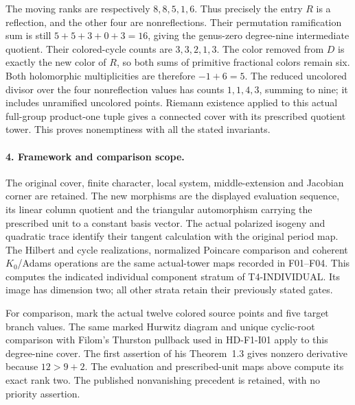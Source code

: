 The moving ranks are respectively $8,8,5,1,6$.
Thus precisely the entry $R$ is a reflection, and the
other four are nonreflections. Their permutation
ramification sum is still $5+5+3+0+3=16$, giving the
genus-zero degree-nine intermediate quotient.
Their colored-cycle counts are $3,3,2,1,3$.
The color removed from $D$ is exactly the new color of
$R$, so both sums of primitive fractional colors remain
six. Both holomorphic multiplicities are therefore
$-1+6=5$.
The reduced uncolored divisor over the four nonreflection
values has counts $1,1,4,3$, summing to nine; it includes
unramified uncolored points. Riemann existence applied
to this actual full-group product-one tuple gives a
connected cover with its prescribed quotient tower.
This proves nonemptiness with all the stated invariants.

\paragraph{4. Framework and comparison scope.}
The original cover, finite character, local system,
middle-extension and Jacobian corner are retained. The
new morphisms are the displayed evaluation sequence,
its linear column quotient and the triangular automorphism
carrying the prescribed unit to a constant basis vector.
The actual polarized isogeny and quadratic trace identify
their tangent calculation with the original period map.
The Hilbert and cycle realizations, normalized Poincare
comparison and coherent $K_0$/Adams operations are the
same actual-tower maps recorded in F01--F04.
This computes the indicated individual component stratum
of T4-INDIVIDUAL. Its image has dimension two; all other
strata retain their previously stated gates.

For comparison, mark the actual twelve colored source
points and five target branch values. The same marked
Hurwitz diagram and unique cyclic-root comparison with
Filom's Thurston pullback used in HD-F1-I01 apply to
this degree-nine cover. The first assertion of his
Theorem~1.3 gives nonzero derivative because $12>9+2$.
The evaluation and prescribed-unit maps above compute
its exact rank two. The published nonvanishing precedent
is retained, with no priority assertion.
